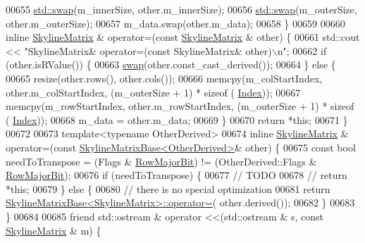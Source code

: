 \begin{DoxyCode}
00655         \hyperlink{endian_8c_a3ca5ecd34b04d6a243c054ac3a57f68d}{std::swap}(m\_innerSize, other.m\_innerSize);
00656         \hyperlink{endian_8c_a3ca5ecd34b04d6a243c054ac3a57f68d}{std::swap}(m\_outerSize, other.m\_outerSize);
00657         m\_data.swap(other.m\_data);
00658     \}
00659 
00660     \textcolor{keyword}{inline} \hyperlink{class_eigen_1_1_skyline_matrix}{SkylineMatrix} & operator=(\textcolor{keyword}{const} \hyperlink{class_eigen_1_1_skyline_matrix}{SkylineMatrix} & other) \{
00661         std::cout << \textcolor{stringliteral}{"SkylineMatrix& operator=(const SkylineMatrix& other)\(\backslash\)n"};
00662         \textcolor{keywordflow}{if} (other.isRValue()) \{
00663             \hyperlink{endian_8c_a3ca5ecd34b04d6a243c054ac3a57f68d}{swap}(other.const\_cast\_derived());
00664         \} \textcolor{keywordflow}{else} \{
00665             resize(other.rows(), other.cols());
00666             memcpy(m\_colStartIndex, other.m\_colStartIndex, (m\_outerSize + 1) * sizeof (
      \hyperlink{group___core___module_a554f30542cc2316add4b1ea0a492ff02}{Index}));
00667             memcpy(m\_rowStartIndex, other.m\_rowStartIndex, (m\_outerSize + 1) * sizeof (
      \hyperlink{group___core___module_a554f30542cc2316add4b1ea0a492ff02}{Index}));
00668             m\_data = other.m\_data;
00669         \}
00670         \textcolor{keywordflow}{return} *\textcolor{keyword}{this};
00671     \}
00672 
00673     \textcolor{keyword}{template}<\textcolor{keyword}{typename} OtherDerived>
00674             \textcolor{keyword}{inline} \hyperlink{class_eigen_1_1_skyline_matrix}{SkylineMatrix} & operator=(\textcolor{keyword}{const} 
      \hyperlink{class_eigen_1_1_skyline_matrix_base}{SkylineMatrixBase<OtherDerived>}& other) \{
00675         \textcolor{keyword}{const} \textcolor{keywordtype}{bool} needToTranspose = (Flags & \hyperlink{group__flags_gae4f56c2a60bbe4bd2e44c5b19cbe8762}{RowMajorBit}) != (OtherDerived::Flags & 
      \hyperlink{group__flags_gae4f56c2a60bbe4bd2e44c5b19cbe8762}{RowMajorBit});
00676         \textcolor{keywordflow}{if} (needToTranspose) \{
00677             \textcolor{comment}{//         TODO}
00678             \textcolor{comment}{//            return *this;}
00679         \} \textcolor{keywordflow}{else} \{
00680             \textcolor{comment}{// there is no special optimization}
00681             \textcolor{keywordflow}{return} \hyperlink{class_eigen_1_1_skyline_matrix_base}{SkylineMatrixBase<SkylineMatrix>::operator=}(
      other.derived());
00682         \}
00683     \}
00684 
00685     \textcolor{keyword}{friend} std::ostream & operator <<(std::ostream & s, \textcolor{keyword}{const} \hyperlink{class_eigen_1_1_skyline_matrix}{SkylineMatrix} & m) \{

\end{DoxyCode}
